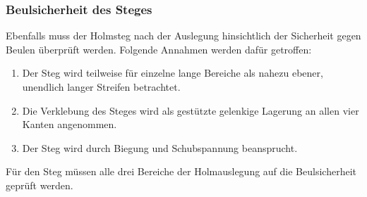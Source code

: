 \subsubsection{Beulsicherheit des Steges}
\label{Beulsicherheit Steg}
Ebenfalls muss der Holmsteg nach der Auslegung hinsichtlich der Sicherheit gegen Beulen überprüft werden. Folgende Annahmen werden dafür getroffen:\\
\begin{enumerate}
	\item Der Steg wird teilweise für einzelne lange Bereiche als nahezu ebener, unendlich langer Streifen betrachtet.
	\item Die Verklebung des Steges wird als gestützte gelenkige Lagerung an allen vier Kanten angenommen.
	\item Der Steg wird durch Biegung und Schubspannung beansprucht.
\end{enumerate}
Für den Steg müssen alle drei Bereiche der Holmauslegung auf die Beulsicherheit geprüft werden. \\

